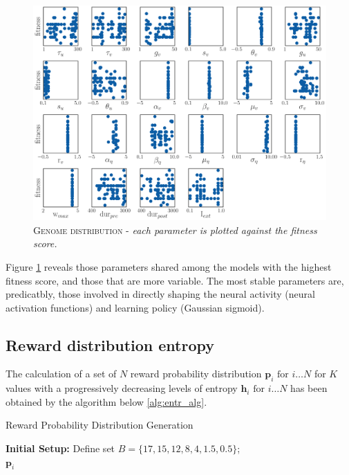 \begin{figure}[H]
    \centering
    \includegraphics[width=1.\textwidth]{figures/evo_tabplot.png}
    \caption{\textsc{Genome distribution} - \textit{each parameter is plotted against the fitness score.}}
    \label{fig:evo_tabplot}
\end{figure}

\noindent Figure \ref{fig:evo_tabplot} reveals those parameters shared among the models with the highest fitness score, and those that are more variable.
The most stable parameters are, predicatbly, those involved in directly shaping the neural activity (neural activation functions) and learning policy (Gaussian sigmoid).


\subsection{Reward distribution entropy}\label{sec:appendix_entropy}

\noindent The calculation of a set of $N$ reward probability distribution $\mathbf{p}_{i}\text{  for  } i\ldots N$ for $K$ values with a progressively decreasing levels of entropy $\mathbf{h}_{i}\text{  for  } i\ldots N$ has been obtained by the algorithm below \ref{alg:entr_alg}.

\begin{algorithm}[H]
\caption{Reward Probability Distribution Generation}
\label{alg:reward_distribution}
\SetAlgoLined
{}
\textbf{Initial Setup:}
Define set $B = \{17, 15, 12, 8, 4, 1.5, 0.5\}$; \\
\Return ${\mathbf{p}_i}$
\end{algorithm}\label{alg:entr_alg}


